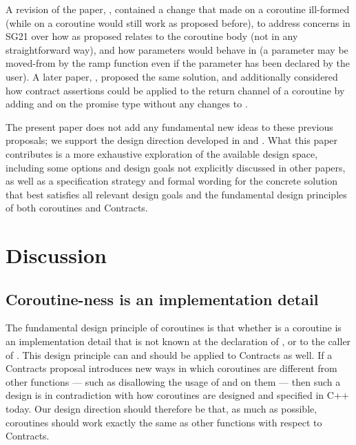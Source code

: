 A revision of the paper, \cite{P2957R1}, contained a change that made  on a coroutine ill-formed (while  on a coroutine would still work as proposed before), to address concerns in SG21 over how  as proposed relates to the coroutine body (not in any straightforward way), and how parameters would behave in  (a parameter may be moved-from by the ramp function even if the parameter has been declared  by the user). A later paper, \cite{P3251R0}, proposed the same solution, and additionally considered how contract assertions could be applied to the return channel of a coroutine by adding  and  on the promise type without any changes to \cite{P2900R8}.

The present paper does not add any fundamental new ideas to these previous proposals; we support the design direction developed in \cite{P2957R0} and \cite{P2957R1}. What this paper contributes is a more exhaustive exploration of the available design space, including some options and design goals not explicitly discussed in other papers, as well as a specification strategy and formal wording for the concrete solution that best satisfies all relevant design goals and the fundamental design principles of both coroutines and Contracts.

\section{Discussion}

\subsection{Coroutine-ness is an implementation detail}
\label{impldetail}

The fundamental design principle of coroutines is that whether  is a coroutine is an implementation detail that is not known at the declaration of , or to the caller of . This design principle can and should be applied to Contracts as well. If a Contracts proposal introduces new ways in which coroutines are different from other functions --- such as disallowing the usage of  and  on them --- then such a design is in contradiction with how coroutines are designed and specified in C++ today. Our design direction should therefore be that, as much as possible, coroutines should work exactly the same as other functions with respect to Contracts.

